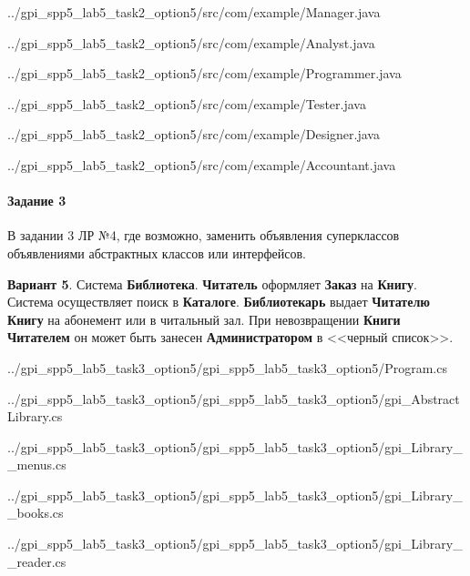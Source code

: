 
{../gpi_spp5_lab5_task2_option5/src/com/example/Manager.java}


{../gpi_spp5_lab5_task2_option5/src/com/example/Analyst.java}


{../gpi_spp5_lab5_task2_option5/src/com/example/Programmer.java}


{../gpi_spp5_lab5_task2_option5/src/com/example/Tester.java}


{../gpi_spp5_lab5_task2_option5/src/com/example/Designer.java}


{../gpi_spp5_lab5_task2_option5/src/com/example/Accountant.java}


\paragraph{Задание 3} \hspace{0cm}

В задании 3 ЛР №4, где возможно,
заменить объявления суперклассов объявлениями абстрактных классов или интерфейсов.

\textbf{Вариант 5}.
Система \textbf{Библиотека}. \textbf{Читатель} оформляет \textbf{Заказ} на \textbf{Книгу}.
Система осуществляет поиск в \textbf{Каталоге}.
\textbf{Библиотекарь} выдает \textbf{Читателю Книгу} на абонемент или в читальный зал.
При невозвращении \textbf{Книги Читателем}
он может быть занесен \textbf{Администратором} в <<черный список>>.


{../gpi_spp5_lab5_task3_option5/gpi_spp5_lab5_task3_option5/Program.cs}

\newpage


{../gpi_spp5_lab5_task3_option5/gpi_spp5_lab5_task3_option5/gpi_AbstractLibrary.cs}

\newpage


{../gpi_spp5_lab5_task3_option5/gpi_spp5_lab5_task3_option5/gpi_Library__menus.cs}


{../gpi_spp5_lab5_task3_option5/gpi_spp5_lab5_task3_option5/gpi_Library__books.cs}

\newpage


{../gpi_spp5_lab5_task3_option5/gpi_spp5_lab5_task3_option5/gpi_Library__reader.cs}
